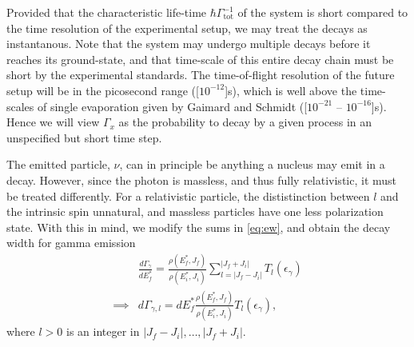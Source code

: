 
Provided that the characteristic life-time $\hbar\Gamma_\text{tot}^{-1}$ of the system is short compared to the time resolution of the experimental setup, we may treat the decays as instantanous. Note that the system may undergo multiple decays before it reaches its ground-state, and that time-scale of this entire decay chain must be short by the experimental standards. 
The time-of-flight resolution of the future \rtb{} setup will be in the picosecond range (\unit[$10^{-12}$]{s})\cite{r3b:online}, which is well above the time-scales of single evaporation given by Gaimard and Schmidt (\unit[$10^{-21}$ -- $10^{-16}$]{s})\cite{gaimard:1991:art}. Hence we will view $\Gamma_x$ as the probability to decay by a given process in an unspecified but short time step.


The emitted particle, $\nu$, can in principle be anything a nucleus may emit in a decay. However, since the photon is massless, and thus fully relativistic, it must be treated differently. For a relativistic particle, the dististinction between $l$ and the intrinsic spin unnatural, and massless particles have one less polarization state. With this in mind, we modify the sums in \eqref{eq:ew}, and obtain the decay width for gamma emission
\begin{align}
&\frac{d\Gamma_{\gamma}}{dE_f^*} = \frac{\rho(E_f^*,J_f)}{\rho(E_i^*,J_i)} \sum_{l=|J_f-J_i|}^{|J_f+J_i|} T_l(\epsilon_\gamma) \\
\implies & d\Gamma_{\gamma,l} =dE_f^* \frac{\rho(E_f^*,J_f)}{\rho(E_i^*,J_i)} T_l(\epsilon_\gamma),\label{eq:gammagamma}
\end{align}
where $l>0$ is an integer in $|J_f - J_i|, \dots, |J_f + J_i|$.

